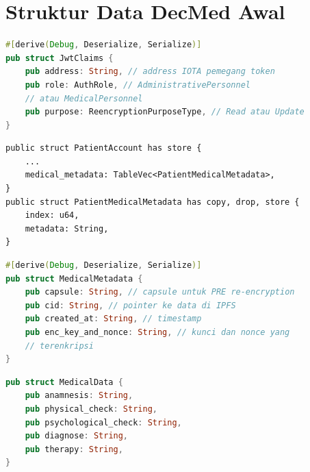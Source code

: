 \chapter{Struktur Data DecMed Awal}
\label{lampiran:struktur-data-decmed-awal}

\begin{lstlisting}[language=Rust, caption={Struktur klaim JWT pada DecMed}, label={lst:decmed-jwt-claims}]
#[derive(Debug, Deserialize, Serialize)]
pub struct JwtClaims {
    pub address: String, // address IOTA pemegang token
    pub role: AuthRole, // AdministrativePersonnel 
    // atau MedicalPersonnel
    pub purpose: ReencryptionPurposeType, // Read atau Update
}
\end{lstlisting}

\begin{lstlisting}[language=Move, caption={Struktur metadata medis pasien pada DecMed}, label={lst:decmed-patient-medical-metadata}]
public struct PatientAccount has store {
    ...
    medical_metadata: TableVec<PatientMedicalMetadata>,
}
public struct PatientMedicalMetadata has copy, drop, store {
    index: u64,
    metadata: String,
}
\end{lstlisting}

\begin{lstlisting}[language=Rust, caption={Struktur serialisasi metadata medis DecMed}, label={lst:decmed-medical-metadata}]
#[derive(Debug, Deserialize, Serialize)]
pub struct MedicalMetadata {
    pub capsule: String, // capsule untuk PRE re-encryption
    pub cid: String, // pointer ke data di IPFS
    pub created_at: String, // timestamp
    pub enc_key_and_nonce: String, // kunci dan nonce yang 
    // terenkripsi
}
\end{lstlisting}

\begin{lstlisting}[language=Rust, caption={Potongan struktur data medis \textit{off-chain} pada DecMed}, label={lst:decmed-medical-data}]
pub struct MedicalData {
    pub anamnesis: String,
    pub physical_check: String,
    pub psychological_check: String,
    pub diagnose: String,
    pub therapy: String,
}
\end{lstlisting}

